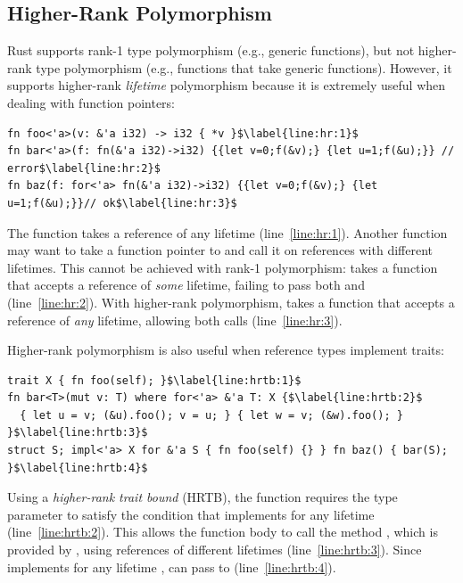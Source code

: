 \subsection{Higher-Rank Polymorphism}
\label{sec:background:hr}

Rust supports rank-1 type polymorphism (e.g., generic functions), but not
higher-rank type polymorphism (e.g., functions that take generic functions).
%
However, it supports higher-rank \emph{lifetime} polymorphism because it is
extremely useful when dealing with function pointers:

\vspace{-0.5em}
\begin{lstlisting}
fn foo<'a>(v: &'a i32) -> i32 { *v }$\label{line:hr:1}$
fn bar<'a>(f: fn(&'a i32)->i32) {{let v=0;f(&v);} {let u=1;f(&u);}} // error$\label{line:hr:2}$
fn baz(f: for<'a> fn(&'a i32)->i32) {{let v=0;f(&v);} {let u=1;f(&u);}}// ok$\label{line:hr:3}$
\end{lstlisting}
\vspace{-0.5em}

\noindent
%
The function  takes a reference of any lifetime (line~\ref{line:hr:1}).
%
Another function may want to take a function pointer to  and call it on
references with different lifetimes.
%
This cannot be achieved with rank-1 polymorphism:
%
 takes a function that accepts a reference of \emph{some} lifetime,
failing to pass both  and  (line~\ref{line:hr:2}).
%
With higher-rank polymorphism,  takes a function that accepts a reference
of \emph{any} lifetime, allowing both calls (line~\ref{line:hr:3}).

Higher-rank polymorphism is also useful when reference types implement traits:

\vspace{-0.5em}
\begin{lstlisting}
trait X { fn foo(self); }$\label{line:hrtb:1}$
fn bar<T>(mut v: T) where for<'a> &'a T: X {$\label{line:hrtb:2}$
  { let u = v; (&u).foo(); v = u; } { let w = v; (&w).foo(); } }$\label{line:hrtb:3}$
struct S; impl<'a> X for &'a S { fn foo(self) {} } fn baz() { bar(S); }$\label{line:hrtb:4}$
\end{lstlisting}
\vspace{-0.5em}

\noindent
%
Using a \emph{higher-rank trait bound} (HRTB), the function  requires the
type parameter  to satisfy the condition that  implements 
for any lifetime  (line~\ref{line:hrtb:2}).
%
This allows the function body to call the method , which is provided by ,
using references of different lifetimes (line~\ref{line:hrtb:3}).
%
Since  implements  for any lifetime ,  can pass
 to  (line~\ref{line:hrtb:4}).

